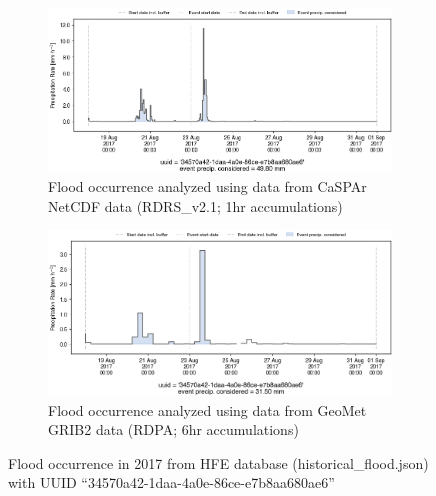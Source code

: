 \documentclass[10pt,a4paper,titlepage,parskip]{scrartcl}
\begin{document}
\begin{figure}[h]
	\begin{subfigure}[a]{1.0\textwidth}
		\centering
		\includegraphics[width=\linewidth]{figures/compare_Geomet_CaSPAr/interpolated_at_stations_occurrence_883_identified-timesteps_RDRS_v2.1.png}
		\caption{Flood occurrence analyzed using data from CaSPAr NetCDF data (RDRS\_v2.1; 1hr accumulations)}
	\end{subfigure}
	\par\bigskip\bigskip
	\begin{subfigure}[b]{1.0\textwidth}
		\centering
		\includegraphics[width=\linewidth]{figures/compare_Geomet_CaSPAr/interpolated_at_stations_occurrence_883_identified-timesteps_rdpa:10km:6f.png}
		\caption{Flood occurrence analyzed using data from GeoMet GRIB2 data (RDPA; 6hr accumulations)}
	\end{subfigure}
	\par\bigskip\bigskip
	\caption{Flood occurrence in 2017 from HFE database (historical\_flood.json) with UUID ``34570a42-1daa-4a0e-86ce-e7b8aa680ae6''}
\end{figure}
\pagebreak
\end{document}
